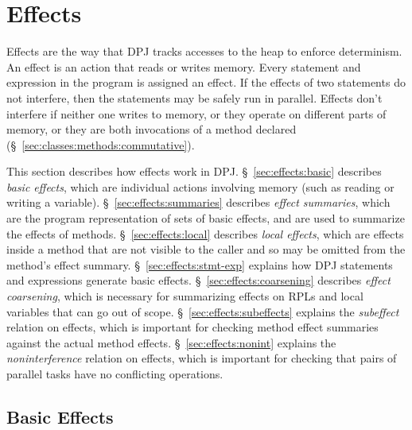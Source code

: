 \section{Effects%
\label{sec:effects}}

Effects are the way that DPJ tracks accesses to the heap to enforce
determinism.  An effect is an action that reads or writes memory.
Every statement and expression in the program is assigned an effect.
If the effects of two statements do not interfere, then the statements
may be safely run in parallel.  Effects don't interfere if neither one
writes to memory, or they operate on different parts of memory, or
they are both invocations of a method declared 
(\S~\ref{sec:classes:methods:commutative}).

This section describes how effects work in DPJ.
\S~\ref{sec:effects:basic} describes \emph{basic effects}, which are
individual actions involving memory (such as reading or writing a
variable).  \S~\ref{sec:effects:summaries} describes \emph{effect
  summaries}, which are the program representation of sets of basic
effects, and are used to summarize the effects of methods.
\S~\ref{sec:effects:local} describes \emph{local effects}, which are
effects inside a method that are not visible to the caller and so may
be omitted from the method's effect summary.
\S~\ref{sec:effects:stmt-exp} explains how DPJ statements and
expressions generate basic effects.  \S~\ref{sec:effects:coarsening}
describes \emph{effect coarsening}, which is necessary for summarizing
effects on RPLs and local variables that can go out of scope.
\S~\ref{sec:effects:subeffects} explains the \emph{subeffect} relation
on effects, which is important for checking method effect summaries
against the actual method effects.  \S~\ref{sec:effects:nonint}
explains the \emph{noninterference} relation on effects, which is
important for checking that pairs of parallel tasks have no
conflicting operations.

\subsection{Basic Effects%
\label{sec:effects:basic}}

